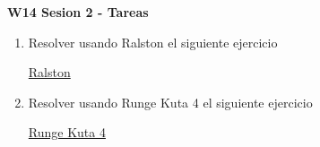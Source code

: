\documentclass{beamer}
\begin{document}
\begin{frame}


\textbf{W14 Sesion 2 - Tareas}


\begin{enumerate}
\item Resolver usando Ralston el siguiente ejercicio

 
\href{https://gomez-metodos-numericos.webnode.es/ecuaciones-diferenciales-ordinarias/ralston/}{Ralston} \\


\item Resolver usando Runge Kuta 4 el siguiente ejercicio

 
\href{https://www.youtube.com/watch?v=RR_VprIzSGM}{Runge Kuta 4} \\



\end{enumerate} 


\end{frame}
\end{document}
